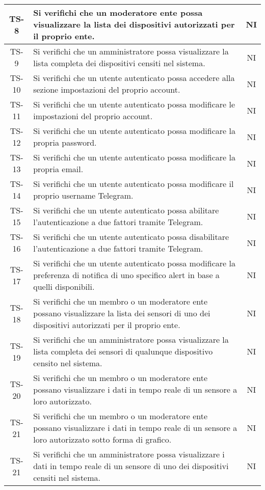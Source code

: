 \begin{center}
\begin{longtable}{|c|p{10cm}|c|}
			 TS-8 & Si verifichi che un moderatore ente possa visualizzare la lista dei dispositivi autorizzati per il proprio ente. & NI \\
			 \hline
			 TS-9 & Si verifichi che un amministratore possa visualizzare la lista completa dei dispositivi censiti nel sistema. & NI \\
			 \hline
			 TS-10 & Si verifichi che un utente autenticato possa accedere alla sezione impostazioni del proprio account. & NI \\
			 \hline
			 TS-11 & Si verifichi che un utente autenticato possa modificare le impostazioni del proprio account. & NI \\
			 \hline
			 TS-12 & Si verifichi che un utente autenticato possa modificare la propria password. & NI \\
			 \hline
			 TS-13 & Si verifichi che un utente autenticato possa modificare la propria email. & NI \\
			 \hline
			 TS-14 & Si verifichi che un utente autenticato possa modificare il proprio username Telegram. & NI \\
			 \hline
			 TS-15 & Si verifichi che un utente autenticato possa abilitare l'autenticazione a due fattori tramite Telegram. & NI \\
			 \hline
			 TS-16 & Si verifichi che un utente autenticato possa disabilitare l'autenticazione a due fattori tramite Telegram. & NI \\
			 \hline
			 TS-17 & Si verifichi che un utente autenticato possa modificare la preferenza di notifica di uno specifico alert in base a quelli disponibili. & NI \\
			 \hline
			 TS-18 & Si verifichi che un membro o un moderatore ente possano visualizzare la lista dei sensori di uno dei dispositivi autorizzati per il proprio ente. & NI \\
			 \hline
			 TS-19 & Si verifichi che un amministratore possa visualizzare la lista completa dei sensori di qualunque dispositivo censito nel sistema. & NI \\
			 \hline
			 TS-20 & Si verifichi che un membro o un moderatore ente possano visualizzare i dati in tempo reale di un sensore a loro autorizzato. & NI \\
			 \hline
			 TS-21 & Si verifichi che un membro o un moderatore ente possano visualizzare i dati in tempo reale di un sensore a loro autorizzato sotto forma di grafico. & NI \\
			 \hline
			 TS-21 & Si verifichi che un amministratore possa visualizzare i dati in tempo reale di un sensore di uno dei dispositivi censiti nel sistema. & NI \\

\end{longtable}
\end{center}
